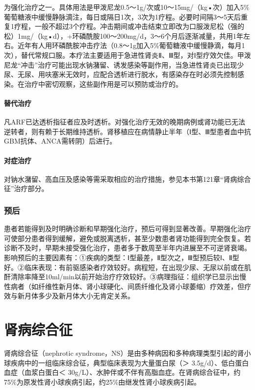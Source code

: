 为强化治疗之一。具体用法是甲泼尼龙0.5～1g/次或10～15mg/（kg•次）加入5\%葡萄糖液中缓慢静脉滴注，每日或隔日1次，3次为1疗程。必要时间隔3～5天后重复1疗程，一般不超过3个疗程。冲击期间或冲击结束立即改为口服泼尼松（强的松）1mg/（kg•d），+环磷酰胺100～200mg/d，3～6个月后逐渐减量，共用1年左右。近年有人用环磷酰胺冲击疗法（0.8～1g加入5\%葡萄糖液中缓慢静滴，每月1次），替代常规口服。本疗法主要适用于急进性肾炎Ⅱ、Ⅲ型，对Ⅰ型疗效欠佳。甲泼尼龙“冲击”治疗可能出现水钠潴留、诱发感染等副作用，当急进性肾炎已出现少尿、无尿、用呋塞米无效时，应配合透析进行脱水，有感染存在时必须先控制感染。在治疗中密切观察，这些副作用是可以预防或治疗的。

\subsubsection{替代治疗}

凡ARF已达透析指征者应及时透析。对强化治疗无效的晚期病例或肾功能已无法逆转者，则有赖于长期维持透析。肾移植应在病情静止半年（Ⅰ型、Ⅲ型患者血中抗GBM抗体、ANCA需转阴）后进行。

\subsubsection{对症治疗}

对钠水潴留、高血压及感染等需采取相应的治疗措施，参见本书第121章“肾病综合征”治疗部分。

\subsection{预后}

患者若能得到及时明确诊断和早期强化治疗，预后可得到显著改善。早期强化治疗可使部分患者得到缓解，避免或脱离透析，甚至少数患者肾功能得到完全恢复。若诊断不及时，早期未接受强化治疗，患者多于数周至半年内进展至不可逆肾衰竭。影响预后的主要因素有：①疾病的类型：Ⅰ型最差，Ⅱ型次之，Ⅲ型预后较Ⅰ、Ⅱ型好。②临床表现：有前驱感染者疗效较好。病程短，在出现少尿、无尿以前或在肌酐清除率降至10ml/min以前开始治疗疗效较好。③病理指征：组织学已显示出慢性病者（如纤维性新月体、肾小球硬化、间质纤维化及肾小球萎缩）疗效差，但疗效与新月体多少及新月体大小无肯定关系。

\protect\hypertarget{text00341.html}{}{}

\chapter{肾病综合征}

肾病综合征（nephrotic
syndrome，NS）是由多种病因和多种病理类型引起的肾小球疾病中的一组临床综合征，典型临床表现为大量蛋白尿（＞
3.5g/d）、低白蛋白血症（血浆白蛋白＜
30g/L）、水肿伴或不伴有高脂血症。在肾病综合征中，约75\%为原发性肾小球疾病引起，约25\%由继发性肾小球疾病引起。

